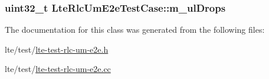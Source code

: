 \subsubsection[{\texorpdfstring{m\+\_\+ul\+Drops}{m_ulDrops}}]{\setlength{\rightskip}{0pt plus 5cm}uint32\+\_\+t Lte\+Rlc\+Um\+E2e\+Test\+Case\+::m\+\_\+ul\+Drops\hspace{0.3cm}{\ttfamily [private]}}\hypertarget{classLteRlcUmE2eTestCase_aba1374edf326035c3804c471cbb844a0}{}\label{classLteRlcUmE2eTestCase_aba1374edf326035c3804c471cbb844a0}


The documentation for this class was generated from the following files\+:\begin{DoxyCompactItemize}
\item 
lte/test/\hyperlink{lte-test-rlc-um-e2e_8h}{lte-\/test-\/rlc-\/um-\/e2e.\+h}\item 
lte/test/\hyperlink{lte-test-rlc-um-e2e_8cc}{lte-\/test-\/rlc-\/um-\/e2e.\+cc}\end{DoxyCompactItemize}
